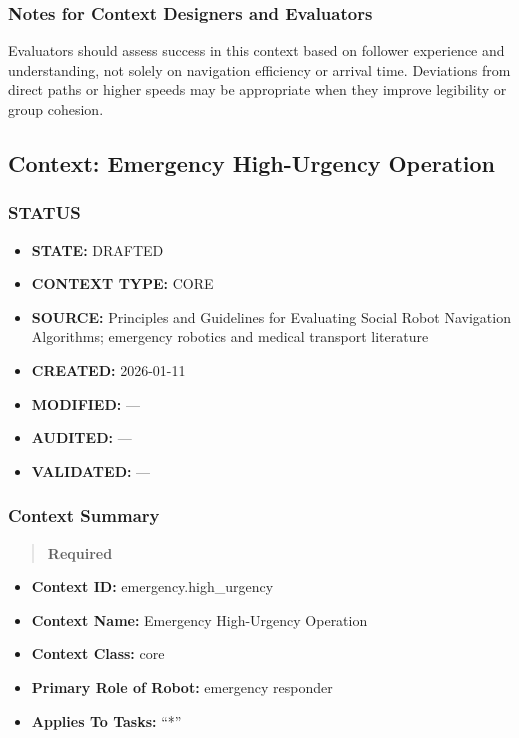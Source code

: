\documentclass[utf8]{frontiers_suppmat} %
\providecommand{\tightlist}{%
  \setlength{\itemsep}{0pt}\setlength{\parskip}{0pt}}
\begin{document}
\subsubsection{Notes for Context Designers and
Evaluators}\label{notes-for-context-designers-and-evaluators}

Evaluators should assess success in this context based on follower
experience and understanding, not solely on navigation efficiency or
arrival time. Deviations from direct paths or higher speeds may be
appropriate when they improve legibility or group cohesion.

\subsection{Context: Emergency High-Urgency
Operation}\label{context-emergency-high-urgency-operation}

\subsubsection{STATUS}\label{status}

\begin{itemize}
\tightlist
\item
  \textbf{STATE:} DRAFTED
\item
  \textbf{CONTEXT TYPE:} CORE
\item
  \textbf{SOURCE:} Principles and Guidelines for Evaluating Social Robot
  Navigation Algorithms; emergency robotics and medical transport
  literature
\item
  \textbf{CREATED:} 2026-01-11
\item
  \textbf{MODIFIED:} ---
\item
  \textbf{AUDITED:} ---
\item
  \textbf{VALIDATED:} ---
\end{itemize}

\subsubsection{Context Summary}\label{context-summary}

\begin{quote}
\textbf{Required}
\end{quote}

\begin{itemize}
\tightlist
\item
  \textbf{Context ID:} emergency.high\_urgency
\item
  \textbf{Context Name:} Emergency High-Urgency Operation
\item
  \textbf{Context Class:} core
\item
  \textbf{Primary Role of Robot:} emergency responder
\item
  \textbf{Applies To Tasks:} ``*''
\end{itemize}
\end{document}
